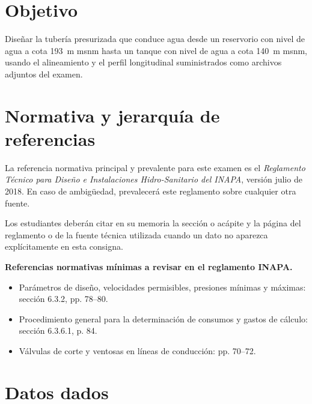 \documentclass[11pt]{article}
\begin{document}

\section{Objetivo}
Diseñar la tubería presurizada que conduce agua desde un reservorio con nivel de agua a cota \SI{193}{\meter} msnm hasta un tanque con nivel de agua a cota \SI{140}{\meter} msnm, usando el alineamiento y el perfil longitudinal suministrados como archivos adjuntos del examen.

\section{Normativa y jerarquía de referencias}
La referencia normativa principal y prevalente para este examen es el \emph{Reglamento Técnico para Diseño e Instalaciones Hidro-Sanitario del INAPA}, versión julio de 2018. En caso de ambigüedad, prevalecerá este reglamento sobre cualquier otra fuente.

Los estudiantes deberán citar en su memoria la sección o acápite y la página del reglamento o de la fuente técnica utilizada cuando un dato no aparezca explícitamente en esta consigna.

\begin{infobox}
\textbf{Referencias normativas mínimas a revisar en el reglamento INAPA.}
\begin{itemize}
\item Parámetros de diseño, velocidades permisibles, presiones mínimas y máximas: sección 6.3.2, pp. 78--80.
\item Procedimiento general para la determinación de consumos y gastos de cálculo: sección 6.3.6.1, p. 84.
\item Válvulas de corte y ventosas en líneas de conducción: pp. 70--72.
\end{itemize}
\end{infobox}

\section{Datos dados}
\end{document}
